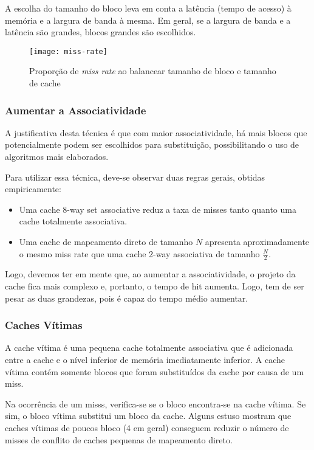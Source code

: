 A escolha do tamanho do bloco leva em conta a latência (tempo de acesso) à memória e a largura de banda à mesma. Em geral, se a largura de banda e a latência são grandes, blocos grandes são escolhidos.

\begin{figure}[ht]
  \centering
  \texttt{[image: miss-rate]}
  \label{fig:miss-rate}
  \caption{Proporção de \textit{miss rate} ao balancear tamanho de bloco e tamanho de cache}
\end{figure}


\subsubsection{Aumentar a Associatividade}
A justificativa desta técnica é que com maior associatividade, há mais blocos que potencialmente podem ser escolhidos para substituição, possibilitando o uso de algoritmos mais elaborados.

Para utilizar essa técnica, deve-se observar duas regras gerais, obtidas empiricamente:
\begin{itemize}
  \item Uma cache 8-way set associative reduz a taxa de misses tanto quanto uma cache totalmente associativa.

  \item Uma cache de mapeamento direto de tamanho $N$ apresenta aproximadamente o mesmo miss rate que uma cache 2-way associativa de tamanho $\frac{N}{2}$.
\end{itemize}

Logo, devemos ter em mente que, ao aumentar a associatividade, o projeto da cache fica mais complexo e, portanto, o tempo de hit aumenta. Logo, tem de ser pesar as duas grandezas, pois é capaz do tempo médio aumentar.


\subsubsection{Caches Vítimas}
A cache vítima é uma pequena cache totalmente associativa que é adicionada entre a cache e o nível inferior de memória imediatamente inferior. A cache vítima contém somente blocos que foram substituídos da cache por causa de um miss.

Na ocorrência de um misss, verifica-se se o bloco encontra-se na cache vítima. Se sim, o bloco vítima substitui um bloco da cache. Alguns estuso mostram que caches vítimas de poucos bloco (4 em geral) conseguem reduzir o número de misses de conflito de caches pequenas de mapeamento direto.



